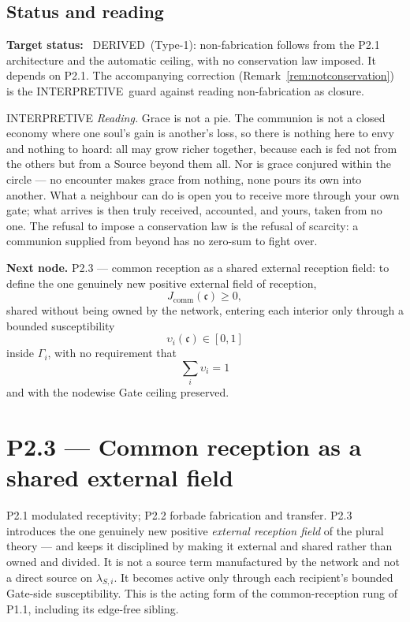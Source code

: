 \documentclass[11pt,a4paper]{article}
\newcommand{\stDerived}{\textcolor{cDer}{\textsf{\small DERIVED}}}
\newcommand{\stInterp}{\textcolor{cInt}{\textsf{\small INTERPRETIVE}}}
\theoremstyle{definition}
\theoremstyle{plain}
\theoremstyle{remark}
\begin{document}
\subsection{Status and reading}

\textbf{Target status:}~
\stDerived\ (Type-1): non-fabrication follows from the P2.1 architecture and the automatic
ceiling, with no conservation law imposed. It depends on P2.1. The accompanying correction
(Remark~\ref{rem:notconservation}) is the \stInterp\ guard against reading non-fabrication
as closure.

\medskip
\stInterp\quad
\emph{Reading.}
Grace is not a pie. The communion is not a closed economy where one soul's gain is
another's loss, so there is nothing here to envy and nothing to hoard: all may grow richer
together, because each is fed not from the others but from a Source beyond them all. Nor is
grace conjured within the circle --- no encounter makes grace from nothing, none pours its
own into another. What a neighbour can do is open you to receive more through your own gate;
what arrives is then truly received, accounted, and yours, taken from no one. The refusal to
impose a conservation law is the refusal of scarcity: a communion supplied from beyond has
no zero-sum to fight over.

\medskip
\textbf{Next node.} P2.3 --- common reception as a shared external reception field:
to define the one genuinely new positive external field of reception,
\[
J_{\mathrm{comm}}(\mathfrak c)\ge0,
\]
shared without being owned by the network, entering each interior only through a
bounded susceptibility
\[
\upsilon_i(\mathfrak c)\in[0,1]
\]
inside \(\Gamma_i\), with no requirement that
\[
\sum_i\upsilon_i=1
\]
and with the nodewise Gate ceiling preserved.

\section{P2.3 --- Common reception as a shared external field}

P2.1 modulated receptivity; P2.2 forbade fabrication and transfer. P2.3 introduces
the one genuinely new positive \emph{external reception field} of the plural
theory --- and keeps it disciplined by making it external and shared rather than
owned and divided. It is not a source term manufactured by the network and not a
direct source on \(\lambda_{S,i}\). It becomes active only through each recipient's
bounded Gate-side susceptibility. This is the acting form of the common-reception
rung of P1.1, including its edge-free sibling.
\end{document}
